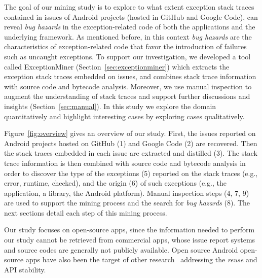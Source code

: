 The goal of our mining study is to explore to what extent exception stack traces 
contained in issues of Android projects (hosted in GitHub and Google Code), can reveal 
\emph{bug hazards} in the exception-related code of both the applications and the underlying framework. 
As mentioned before, in this context \emph{bug hazards} are the characteristics of exception-related code 
that favor the introduction of failures such as uncaught exceptions. 
To support our investigation, we developed a tool called ExceptionMiner (Section~\ref{sec:exceptionminer})
which extracts the exception stack traces embedded on issues, 
and combines stack trace information with source code and bytecode 
analysis. Moreover, we use manual inspection to augment
 the understanding of stack traces and support further discussions and insights (Section~\ref{sec:manual}).
In this study we explore the domain quantitatively and highlight interesting cases by 
exploring cases qualitatively. 


Figure~\ref{fig:overview} gives an overview of our study.
First,  the issues reported on Android projects hosted on GitHub (1) and Google Code (2) are recovered.
Then the stack traces embedded in each issue are extracted and distilled (3).
The stack trace information is then combined with source code and bytecode analysis in order to discover 
the type of the exceptions (5) reported on the stack traces (e.g., error, runtime, checked),
and the origin (6) of such exceptions 
(e.g., the application, a library, the Android platform). 
Manual inspection steps (4, 7, 9) are used to support the mining process  and 
the search for \emph{bug hazards}  (8). The next sections detail each step of this mining process.

Our study focuses on open-source apps, since the information needed to perform our study
cannot be retrieved from commercial apps, whose issue report systems and 
source codes are generally not publicly available. 
Open source Android open-source apps have also been the 
target of other research~\cite{Linar13,Ruiz12} addressing the \emph{reuse} and API stability. 



